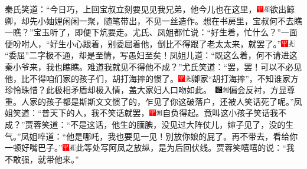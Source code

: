 秦氏笑道：“今日巧，上回宝叔立刻要见见我兄弟，他今儿也在这里，{\includegraphics[width=3mm]{../Images/00002}\includegraphics[width=3mm]{../Images/00010}\footnotesize \kaishu 欲出鲸卿，却先小妯娌闲闲一聚，随笔带出，不见一丝造作。}想在书房里，宝叔何不去瞧一瞧？”宝玉听了，即便下炕要走。尤氏、凤姐都忙说：“好生着，忙什么？”一面便吩咐人，“好生小心跟着，别委屈着他，倒比不得跟了老太太来，就罢了。”{\includegraphics[width=3mm]{../Images/00002}\includegraphics[width=3mm]{../Images/00012}\footnotesize \kaishu “委屈”二字极不通，却是至情，写愚妇至矣！}凤姐儿道：“既这么着，何不请进这秦小爷来，我也瞧瞧。难道我就见不得他不成？”尤氏笑道：“罢，罢！可以不必见他，比不得咱们家的孩子们，胡打海摔的惯了。{{\includegraphics[width=3mm]{../Images/00002}\includegraphics[width=3mm]{../Images/00012}\footnotesize \kaishu 卿家“胡打海摔”，不知谁家方珍怜珠惜？此极相矛盾却极入情，盖大家妇人口吻如此。　}\includegraphics[width=3mm]{../Images/00006}\includegraphics[width=3mm]{../Images/00011}\footnotesize \kaishu 偏会反衬，方显尊重。}人家的孩子都是斯斯文文惯了的，乍见了你这破落户，还被人笑话死了呢。”凤姐笑道：“普天下的人，我不笑话就罢，{\includegraphics[width=3mm]{../Images/00002}\includegraphics[width=3mm]{../Images/00011}\footnotesize \kaishu 自负得起。}竟叫这小孩子笑话我不成？”贾蓉笑道：“不是这话，他生的腼腆，没见过大阵仗儿，婶子见了，没的生气。”凤姐啐道：“他是哪吒，我也要见一见！别放你娘的屁了。再不带去，看给你一顿好嘴巴子。”{\includegraphics[width=3mm]{../Images/00002}\includegraphics[width=3mm]{../Images/00010}\footnotesize \kaishu 此等处写阿凤之放纵，是为后回伏线。}贾蓉笑嘻嘻的说：“我不敢强，就带他来。”


